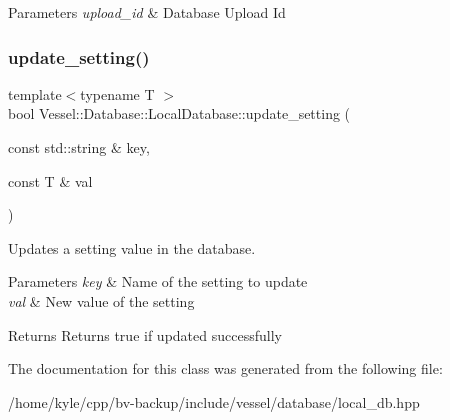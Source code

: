 \begin{DoxyParams}{Parameters}
{\em upload\+\_\+id} & Database Upload Id \\
\hline
\end{DoxyParams}
\mbox{\label{class_vessel_1_1_database_1_1_local_database_a94da226c9c5561a4cb88290c6aa334a3}} 
\subsubsection{\texorpdfstring{update\+\_\+setting()}{update\_setting()}}
{\footnotesize\ttfamily template$<$typename T $>$ \\
bool Vessel\+::\+Database\+::\+Local\+Database\+::update\+\_\+setting (\begin{DoxyParamCaption}\item[{const std\+::string \&}]{key,  }\item[{const T \&}]{val }\end{DoxyParamCaption})}



Updates a setting value in the database. 


\begin{DoxyParams}{Parameters}
{\em key} & Name of the setting to update \\
\hline
{\em val} & New value of the setting \\
\hline
\end{DoxyParams}
\begin{DoxyReturn}{Returns}
Returns true if updated successfully 
\end{DoxyReturn}


The documentation for this class was generated from the following file\+:\begin{DoxyCompactItemize}
\item 
/home/kyle/cpp/bv-\/backup/include/vessel/database/local\+\_\+db.\+hpp\end{DoxyCompactItemize}
